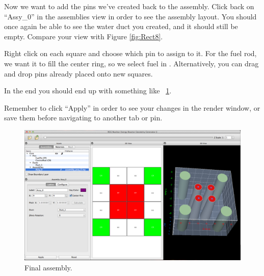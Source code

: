 Now we want to add the pins we've created back to the assembly.  Click back on ``Assy\_0'' in the assemblies view in order to see the assembly layout.  You should once again be able to see the water duct you created, and it should still be empty.  Compare your view with Figure \ref{fig:Rect8}.

Right click on each square and choose which pin to assign to it.  For the fuel rod, we want it to fill the center ring, so we select fuel in .  Alternatively, you can drag and drop pins already placed onto new squares.

In the end you should end up with something like ~\ref{fig:Rect10}.

Remember to click ``Apply'' in order to see your changes in the render window, or save them before navigating to another tab or pin.

\begin{figure}[t]
\begin{center}
\includegraphics[width=0.8\linewidth]{Images/rect-final-assy1.png}
\caption{Final assembly.}
\label{fig:Rect10}
\end{center}
\end{figure}

